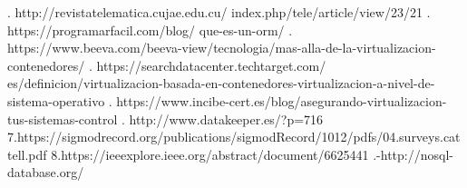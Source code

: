 \documentclass[twoside,onecolumn]{article}
\begin{document}
\begin{flushright}
\begin{itemize}
\begin{thebibliography}{99} %



. http://revistatelematica.cujae.edu.cu/
index.php/tele/article/view/23/21
 \break
{}. https://programarfacil.com/blog/
que-es-un-orm/
\break
{}. https://www.beeva.com/beeva-view/tecnologia/mas-alla-de-la-virtualizacion-contenedores/
\break
{}. https://searchdatacenter.techtarget.com/
es/definicion/virtualizacion-basada-en-contenedores-virtualizacion-a-nivel-de-sistema-operativo
\break
{}. https://www.incibe-cert.es/blog/asegurando-virtualizacion-tus-sistemas-control
\break
{}. http://www.datakeeper.es/?p=716
\break
\newblock
7.https://sigmodrecord.org/publications/sigmodRecord/1012/pdfs/04.surveys.cattell.pdf
\break
\newblock
8.https://ieeexplore.ieee.org/abstract/document/6625441
\break
{}.-http://nosql-database.org/
\break
\newblock {\em }
 
\end{thebibliography}



\end{itemize}
\end{flushright}
\end{document}
